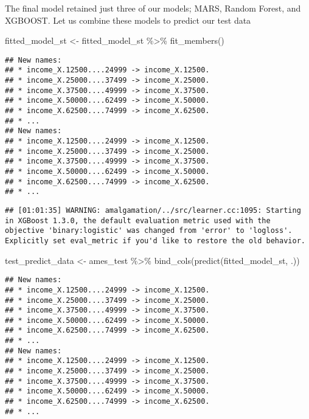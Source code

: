 \documentclass[
]{article}
\newenvironment{Shaded}{\begin{snugshade}}{\end{snugshade}}
\newcommand{\FunctionTok}[1]{\textcolor[rgb]{0.00,0.00,0.00}{#1}}
\newcommand{\NormalTok}[1]{#1}
\newcommand{\OtherTok}[1]{\textcolor[rgb]{0.56,0.35,0.01}{#1}}
\newcommand{\SpecialCharTok}[1]{\textcolor[rgb]{0.00,0.00,0.00}{#1}}
\begin{document}
The final model retained just three of our models; MARS, Random Forest,
and XGBOOST. Let us combine these models to predict our test data

\begin{Shaded}
\begin{Highlighting}[]
\NormalTok{fitted\_model\_st }\OtherTok{\textless{}{-}}
\NormalTok{  fitted\_model\_st }\SpecialCharTok{\%\textgreater{}\%}
  \FunctionTok{fit\_members}\NormalTok{()}
\end{Highlighting}
\end{Shaded}

\begin{verbatim}
## New names:
## * income_X.12500....24999 -> income_X.12500.
## * income_X.25000....37499 -> income_X.25000.
## * income_X.37500....49999 -> income_X.37500.
## * income_X.50000....62499 -> income_X.50000.
## * income_X.62500....74999 -> income_X.62500.
## * ...
## New names:
## * income_X.12500....24999 -> income_X.12500.
## * income_X.25000....37499 -> income_X.25000.
## * income_X.37500....49999 -> income_X.37500.
## * income_X.50000....62499 -> income_X.50000.
## * income_X.62500....74999 -> income_X.62500.
## * ...
\end{verbatim}

\begin{verbatim}
## [01:01:35] WARNING: amalgamation/../src/learner.cc:1095: Starting in XGBoost 1.3.0, the default evaluation metric used with the objective 'binary:logistic' was changed from 'error' to 'logloss'. Explicitly set eval_metric if you'd like to restore the old behavior.
\end{verbatim}

\begin{Shaded}
\begin{Highlighting}[]
\NormalTok{test\_predict\_data }\OtherTok{\textless{}{-}} 
\NormalTok{  ames\_test }\SpecialCharTok{\%\textgreater{}\%}
  \FunctionTok{bind\_cols}\NormalTok{(}\FunctionTok{predict}\NormalTok{(fitted\_model\_st, .))}
\end{Highlighting}
\end{Shaded}

\begin{verbatim}
## New names:
## * income_X.12500....24999 -> income_X.12500.
## * income_X.25000....37499 -> income_X.25000.
## * income_X.37500....49999 -> income_X.37500.
## * income_X.50000....62499 -> income_X.50000.
## * income_X.62500....74999 -> income_X.62500.
## * ...
## New names:
## * income_X.12500....24999 -> income_X.12500.
## * income_X.25000....37499 -> income_X.25000.
## * income_X.37500....49999 -> income_X.37500.
## * income_X.50000....62499 -> income_X.50000.
## * income_X.62500....74999 -> income_X.62500.
## * ...
\end{verbatim}
\end{document}
